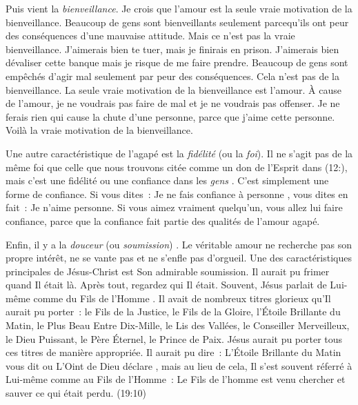 Puis vient la \emph{bienveillance}. Je crois que l'amour est la seule
 vraie motivation de la bienveillance.
 Beaucoup de gens sont bienveillants seulement parcequ'ils ont peur
 des conséquences d'une mauvaise attitude.
 Mais ce n'est pas la vraie bienveillance.
 \og J'aimerais bien te tuer, mais je finirais en prison. \fg{}
 \og J'aimerais bien dévaliser cette banque mais je risque
 de me faire prendre. \fg{}
 Beaucoup de gens sont empêchés d'agir mal seulement par peur
 des conséquences. Cela n'est pas de la bienveillance.
 La seule vraie motivation de la bienveillance est l'amour.
 À cause de l'amour, je ne voudrais pas faire de mal
 et je ne voudrais pas offenser. Je ne ferais rien qui cause
 la chute d'une personne, parce que j'aime cette personne.
 Voilà la vraie motivation de la bienveillance.

\begin{specialpar}{}
Une autre caractéristique de l'agapé est la \emph{fidélité}
 (ou la \emph{foi}).
 Il ne s'agit pas de la même foi que celle que nous trouvons citée
 comme un don de l'Esprit dans (12:),
 mais c'est une fidélité ou une confiance dans les \emph{gens}
 .
 C'est simplement une forme de confiance. Si vous dites~:
 \og Je ne fais confiance à personne \fg{}, vous dites en fait~:
 \og Je n'aime personne. \fg{}
 Si vous aimez vraiment quelqu'un, vous allez lui faire confiance,
 parce que la confiance fait partie des qualités de l'amour agapé.
\end{specialpar}

\begin{specialpar}{}
Enfin, il y a la \emph{douceur} (ou \emph{soumission})
 .
 Le véritable amour ne recherche pas son propre intérêt,
 ne se vante pas et ne s'enfle pas d'orgueil.
 Une des caractéristiques principales de Jésus-Christ
 est Son admirable soumission. Il aurait pu frimer quand Il était là.
 Après tout, regardez qui Il était. Souvent, Jésus parlait de Lui-même
 comme du \og Fils de l'Homme \fg{}.
 Il avait de nombreux titres glorieux qu'Il aurait pu porter~:
 le Fils de la Justice, le Fils de la Gloire, l'Étoile Brillante du Matin,
 le Plus Beau Entre Dix-Mille, le Lis des Vallées,
 le Conseiller Merveilleux, le Dieu Puissant, le Père Éternel,
 le Prince de Paix. Jésus aurait pu porter tous ces titres
 de manière appropriée. Il aurait pu dire~:
 \og L'Étoile Brillante du Matin vous dit \fg{} ou
 \og L'Oint de Dieu déclare \fg{}, mais au lieu de cela,
 Il s'est souvent réferré à Lui-même comme au Fils de l'Homme~:
 \og Le Fils de l'homme est venu chercher et sauver
 ce qui était perdu. \fg{} (19:10)
\end{specialpar}

